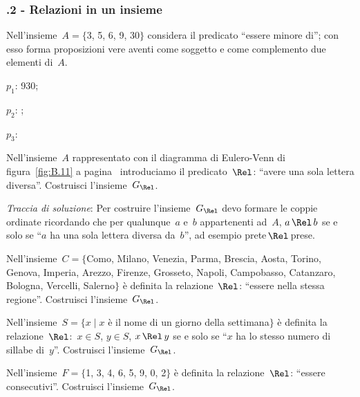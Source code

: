 \begin{multicols}{2}
\subsubsection*{\thechapter.2 - Relazioni in un insieme}
\begin{esercizio}
\label{ese:B.2}
Nell'insieme~$A = \{$3, 5, 6, 9, 30$\}$ considera il predicato ``essere minore di''; con esso forma proposizioni vere aventi come soggetto e come complemento due elementi di~$A$.
\begin{enumeratea}
\item $p_1$: 930;
\item $p_2$: \dotfill;
\item $p_3$: \dotfill
\end{enumeratea}
\end{esercizio}

\begin{esercizio}
\label{ese:B.3}
Nell'insieme~$A$ rappresentato con il diagramma di Eulero-Venn di figura~\ref{fig:B.11} a pagina~\pageref{fig:B.11} introduciamo il predicato~$\Rel$: ``avere
una sola lettera diversa''. Costruisci l'insieme~$G_\Rel$.

\emph{Traccia di soluzione}:
Per costruire l'insieme~$G_\Rel$ devo formare le coppie ordinate ricordando che per qualunque~$a$ e~$b$ appartenenti ad~$A$, $a \,\Rel\, b$
se e solo se ``$a$ ha una sola lettera diversa da~$b$'', ad esempio prete$\,\Rel\,$prese.
\end{esercizio}

\begin{esercizio}
\label{ese:B.4}
Nell'insieme~$C = \{$Como, Milano, Venezia, Parma, Brescia, Aosta, Torino, Genova, Imperia, Arezzo,
Firenze, Grosseto, Napoli, Campobasso, Catanzaro, Bologna, Vercelli, Salerno$\}$ è definita la
relazione~$\Rel$: ``essere nella stessa regione''. Costruisci l'insieme~$G_\Rel$.
\end{esercizio}

\begin{esercizio}
\label{ese:B.5}
Nell'insieme~$S = \{ x \mid  x$ è il nome di un giorno della settimana$\}$ è definita la
relazione~$\Rel$:~$x \in S$, $y \in S$, $x \,\Rel\, y$ se e solo se ``$x$ ha
lo stesso numero di sillabe di~$y$''. Costruisci l'insieme~$G_\Rel$.
\end{esercizio}

\begin{esercizio}
\label{ese:B.6}
Nell'insieme~$F = \{$1, 3, 4, 6, 5, 9, 0, 2$\}$ è definita la relazione~$\Rel$: ``essere consecutivi''. Costruisci l'insieme~$G_\Rel$.
\end{esercizio}
\end{multicols}

